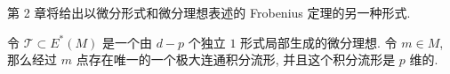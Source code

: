\begin{remark}
第 2 章将给出以微分形式和微分理想表述的 Frobenius 定理的另一种形式. 
\end{remark}

\begin{thm}[Frobenius定理用微分形式与微分理想表示的形式]
    令 $\mathscr{T} \subset E^*(M)$ 是一个由 $d-p$ 个独立 $1$ 形式局部生成的微分理想. 令 $m \in M$, 那么经过 $m$ 点存在唯一的一个极大连通积分流形, 并且这个积分流形是 $p$ 维的.
\end{thm}






































































































